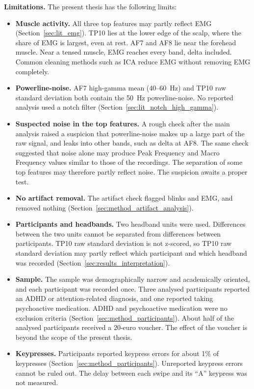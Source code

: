 \documentclass[12pt,a4paper]{report}
\begin{document}
\textbf{Limitations.} The present thesis has the following limits:
\begin{itemize}
    \item \textbf{Muscle activity.} All three top features may partly reflect EMG (Section~\ref{sec:lit_emg}). TP10 lies at the lower edge of the scalp, where the share of EMG is largest, even at rest. AF7 and AF8 lie near the forehead muscle. Near a tensed muscle, EMG reaches every band, delta included. Common cleaning methods such as ICA reduce EMG without removing EMG completely.
    \item \textbf{Powerline-noise.} AF7 high-gamma mean (40--60~Hz) and TP10 raw standard deviation both contain the 50~Hz powerline-noise. No reported analysis used a notch filter (Section~\ref{sec:lit_notch_high_gamma}).
    \item \textbf{Suspected noise in the top features.} A rough check after the main analysis raised a suspicion that powerline-noise makes up a large part of the raw signal, and leaks into other bands, such as delta at AF8. The same check suggested that noise alone may produce Peak Frequency and Macro Frequency values similar to those of the recordings. The separation of some top features may therefore partly reflect noise. The suspicion awaits a proper test.
    \item \textbf{No artifact removal.} The artifact check flagged blinks and EMG, and removed nothing (Section~\ref{sec:method_artifact_analysis}).
    \item \textbf{Participants and headbands.} Two headband units were used. Differences between the two units cannot be separated from differences between participants. TP10 raw standard deviation is not z-scored, so TP10 raw standard deviation may partly reflect which participant and which headband was recorded (Section~\ref{sec:results_interpretation}).
    \item \textbf{Sample.} The sample was demographically narrow and academically oriented, and each participant was recorded once. Three analysed participants reported an ADHD or attention-related diagnosis, and one reported taking psychoactive medication. ADHD and psychoactive medication were no exclusion criteria (Section~\ref{sec:method_participants}). About half of the analysed participants received a 20-euro voucher. The effect of the voucher is beyond the scope of the present thesis.
    \item \textbf{Keypresses.} Participants reported keypress errors for about 1\% of keypresses (Section~\ref{sec:method_participants}). Unreported keypress errors cannot be ruled out. The delay between each swipe and its ``A'' keypress was not measured.

\end{itemize}
\end{document}

